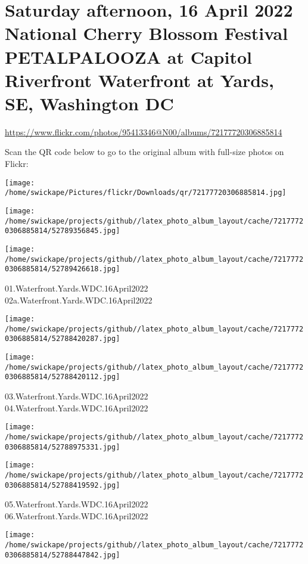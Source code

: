 \documentclass[10pt,letterpaper]{article}
\title{}
\author{}
\date{}
\begin{document}
\section*{Saturday afternoon, 16 April 2022 National Cherry Blossom Festival PETALPALOOZA at Capitol Riverfront Waterfront at Yards, SE, Washington DC}

\url{https://www.flickr.com/photos/95413346@N00/albums/72177720306885814}

Scan the QR code below to go to the original album with full-size photos on Flickr:

\texttt{[image: /home/swickape/Pictures/flickr/Downloads/qr/72177720306885814.jpg]}
\pagebreak

\texttt{[image: /home/swickape/projects/github//latex\_photo\_album\_layout/cache/72177720306885814/52789356845.jpg]}

\vspace{0.25in}
\texttt{[image: /home/swickape/projects/github//latex\_photo\_album\_layout/cache/72177720306885814/52789426618.jpg]}

01.Waterfront.Yards.WDC.16April2022\\
02a.Waterfront.Yards.WDC.16April2022
\pagebreak

\texttt{[image: /home/swickape/projects/github//latex\_photo\_album\_layout/cache/72177720306885814/52788420287.jpg]}

\vspace{0.25in}
\texttt{[image: /home/swickape/projects/github//latex\_photo\_album\_layout/cache/72177720306885814/52788420112.jpg]}

03.Waterfront.Yards.WDC.16April2022\\
04.Waterfront.Yards.WDC.16April2022
\pagebreak

\texttt{[image: /home/swickape/projects/github//latex\_photo\_album\_layout/cache/72177720306885814/52788975331.jpg]}

\vspace{0.25in}
\texttt{[image: /home/swickape/projects/github//latex\_photo\_album\_layout/cache/72177720306885814/52788419592.jpg]}

05.Waterfront.Yards.WDC.16April2022\\
06.Waterfront.Yards.WDC.16April2022
\pagebreak

\texttt{[image: /home/swickape/projects/github//latex\_photo\_album\_layout/cache/72177720306885814/52788447842.jpg]}
\end{document}

